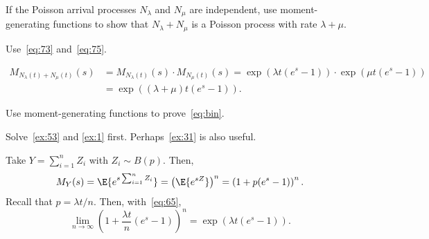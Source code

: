 \begin{exercise}\label{ex:41}
 If the Poisson arrival processes $N_\lambda$ and $N_\mu$ are independent, use moment-generating functions to show that $N_\lambda + N_\mu$ is a Poisson process with rate $\lambda + \mu$.
\begin{hint}
 Use~\cref{eq:73} and~\cref{eq:75}.
\end{hint}

\begin{solution}
\begin{align*}
M_{N_\lambda(t)+N_\mu(t)}(s)
&= M_{N_\lambda(t)}(s)\cdot M_{N_{\mu}(t)}(s)
=\exp(\lambda t (e^s -1))\cdot \exp(\mu t(e^s-1)) \\
&= \exp((\lambda + \mu)t (e^s-1)).
\end{align*}
\end{solution}
\end{exercise}

\begin{exercise} \label{ex:96}
 Use moment-generating functions to prove~\cref{eq:bin}.
\begin{hint}
Solve~\cref{ex:53} and \cref{ex:1} first. Perhaps~\cref{ex:31} is also useful.
\end{hint}
\begin{solution}
Take $Y=\sum_{i=1}^n Z_i$ with $Z_i\sim B(p)$. Then,
\begin{equation*}
M_Y(s) = \E{e^{s\sum_{i=1}^n Z_i}} = \left(\E{e^{s Z}}\right)^n = \left(1 + p (e^s - 1)\right)^n.
\end{equation*}
Recall that $p= \lambda t/ n$. Then, with~\cref{eq:65},
\begin{equation*}
\lim_{n\to\infty} \left(1 + \frac{\lambda t}{n} (e^s - 1)\right)^n = \exp({\lambda t (e^s-1)}).
\end{equation*}
\end{solution}
\end{exercise}






